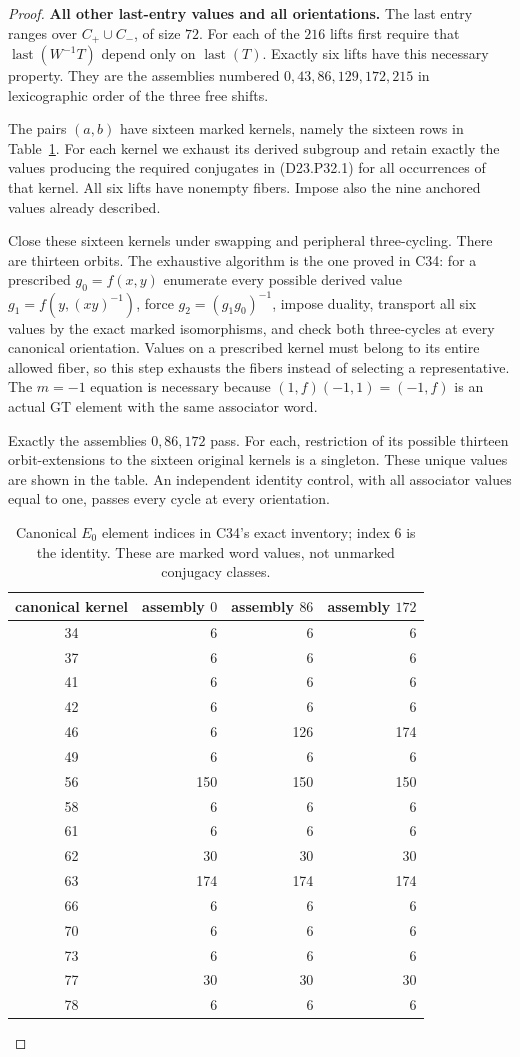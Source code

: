 \begin{proof}
\medskip\noindent\textbf{All other last-entry values and all orientations.}\quad
The last entry ranges over $C_+\cup C_-$, of size $72$.
For each of the $216$ lifts first require that
$\operatorname{last}(W^{-1}T)$ depend only on
$\operatorname{last}(T)$. Exactly six lifts have this
necessary property. They are the assemblies numbered
$0,43,86,129,172,215$ in lexicographic order of the
three free shifts.

The pairs $(a,b)$ have sixteen marked kernels, namely the
sixteen rows in Table~\ref{D23.P32.table}. For each kernel
we exhaust its derived subgroup and retain exactly the
values producing the required conjugates in (D23.P32.1)
for all occurrences of that kernel. All six lifts have
nonempty fibers. Impose also the nine anchored values
already described.

Close these sixteen kernels under swapping and peripheral
three-cycling. There are thirteen orbits. The exhaustive
algorithm is the one proved in C34: for a prescribed
$g_0=f(x,y)$ enumerate every possible derived value
$g_1=f(y,(xy)^{-1})$, force
$g_2=(g_1g_0)^{-1}$, impose duality, transport all six
values by the exact marked isomorphisms, and check both
three-cycles at every canonical orientation. Values on a
prescribed kernel must belong to its entire allowed fiber,
so this step exhausts the fibers instead of selecting a
representative. The $m=-1$ equation is necessary because
$(1,f)(-1,1)=(-1,f)$ is an actual GT element with the
same associator word.

Exactly the assemblies $0,86,172$ pass. For each, restriction
of its possible thirteen orbit-extensions to the sixteen
original kernels is a singleton. These unique values are
shown in the table. An independent identity control, with
all associator values equal to one, passes every cycle
at every orientation.

\begin{table}[h]
\centering
\begin{tabular}{c|rrr}
canonical kernel&assembly $0$&assembly $86$&assembly $172$\\\hline
34&6&6&6\\
37&6&6&6\\
41&6&6&6\\
42&6&6&6\\
46&6&126&174\\
49&6&6&6\\
56&150&150&150\\
58&6&6&6\\
61&6&6&6\\
62&30&30&30\\
63&174&174&174\\
66&6&6&6\\
70&6&6&6\\
73&6&6&6\\
77&30&30&30\\
78&6&6&6
\end{tabular}
\caption{Canonical $E_0$ element indices in C34's exact
inventory; index $6$ is the identity. These are marked
word values, not unmarked conjugacy classes.}
\label{D23.P32.table}
\end{table}


\end{proof}
